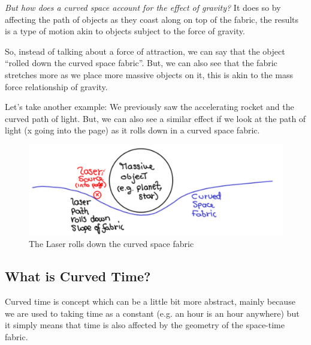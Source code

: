 \documentclass[12pt, letterpaper]{article}
\begin{document}
    \emph{But how does a curved space account for the effect of gravity?} 
    It does so by affecting the path of objects as they coast along on 
    top of the fabric, the results is a type of motion akin to objects subject 
    to the force of gravity.
    
    \medskip
    So, instead of talking about a force of attraction, 
    we can say that the object ``rolled down the curved space fabric''. 
    But, we can also see that the fabric stretches more as we place 
    more massive objects on it, this is akin to the mass force relationship 
    of gravity.
    
    \medskip
    Let's take another example: We previously saw the accelerating rocket 
    and the curved path of light. But, we can also see a similar effect 
    if we look at the path of light (x going into the page) as it rolls 
    down in a curved space fabric. 
    
     \begin{figure}[h!]
        \caption{The Laser rolls down the curved space fabric}
        \centering
        \includegraphics[scale=0.5]{planet_curves_space_fabric.pdf}
    \end{figure}         
    
    \subsection*{What is Curved Time?}
    Curved time is concept which can be a little bit more abstract, mainly 
    because we are used to taking time as a constant (e.g. an hour is an 
    hour anywhere) but it simply means that time is also affected by the 
    geometry of the space-time fabric.
    
\end{document}

